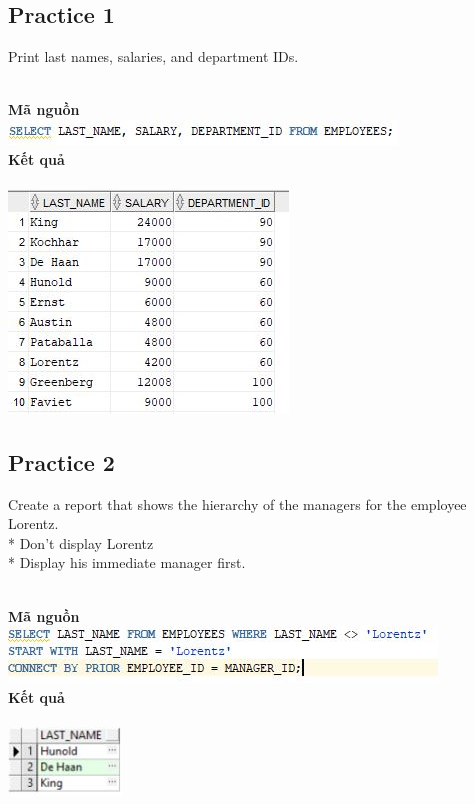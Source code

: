 \documentclass[12pt,a4paper]{report}
\begin{document}
\subsection{Practice 1}
\begin{boxedminipage}[t]{9.5cm}
	Print last names, salaries, and department IDs.
	
	
\end{boxedminipage}
\newline
\\
\textbf{Mã nguồn}
\\
\newline
\includegraphics[scale=1]{111.jpg}\\
\textbf{Kết quả}\\\\
\includegraphics[scale=1]{k111.jpg}

\subsection{Practice 2}
\begin{boxedminipage}[t]{15.5cm}
Create a report that shows the hierarchy of the managers for the employee Lorentz.\\
* Don’t display Lorentz\\
* Display his immediate manager first.
\end{boxedminipage}
\newline
\\
\textbf{Mã nguồn}
\\
\newline
\includegraphics[scale=1]{211.jpg}\\
\textbf{Kết quả}\\\\
\includegraphics[scale=1]{k211.jpg}
\end{document}
